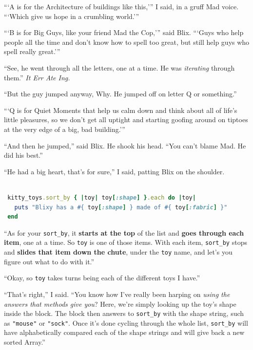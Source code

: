 \documentclass[10pt,twoside]{report}
\begin{document}
```A is for the Architecture of buildings like this,''' I said, in a
gruff Mad voice. ```Which give us hope in a crumbling world.'''

```B is for Big Guys, like your friend Mad the Cop,''' said Blix.
```Guys who help people all the time and don't know how to spell too
great, but still help guys who spell really great.'''

``See, he went through all the letters, one at a time.  He was {\em
  iterating} through them.'' {\em It Err Ate Ing.}

``But the guy jumped anyway, Why.  He jumped off on letter Q or
something.''

```Q is for Quiet Moments that help us calm down and think about all
of life's little pleasures, so we don't get all uptight and starting
goofing around on tiptoes at the very edge of a big, bad building.'''

``And then he jumped,'' said Blix.  He shook his head.  ``You can't
blame Mad.  He did his best.''

``He had a big heart, that's for sure,'' I said, patting Blix on the
shoulder.


\begin{lstlisting}[basicstyle=\ttfamily\color{basiccolor},
    commentstyle = \ttfamily\color{commentcolor},
    keywordstyle=\ttfamily\color{keywordscolor},
    stringstyle=\color{stringcolor},
    language=Ruby,
    basicstyle=\small\ttfamily,
    showstringspaces=false,
  ]

 kitty_toys.sort_by { |toy| toy[:shape] }.each do |toy|
   puts "Blixy has a #{ toy[:shape] } made of #{ toy[:fabric] }"
 end

\end{lstlisting}

``As for your \lstinline[breaklines=true]|sort_by|, it {\bf starts at
  the top} of the list and {\bf goes through each item}, one at a
time. So \lstinline[breaklines=true]|toy| is one of those items.  With
each item, \lstinline[breaklines=true]|sort_by| stops and {\bf slides
  that item down the chute}, under the
\lstinline[breaklines=true]|toy| name, and let's you figure out what
to do with it.''

``Okay, so \lstinline[breaklines=true]|toy| takes turns being each of
the different toys I have.''

``That's right,'' I said.  ``You know how I've really been harping on
{\em using the answers that methods give you}?  Here, we're simply
looking up the toy's shape inside the block.  The block then answers
to \lstinline[breaklines=true]|sort_by| with the shape string, such as
\lstinline[breaklines=true]|"mouse"| or
\lstinline[breaklines=true]|"sock"|.  Once it's done cycling through
the whole list, \lstinline[breaklines=true]|sort_by| will have
alphabetically compared each of the shape strings and will give back a
new sorted Array.''
\end{document}
